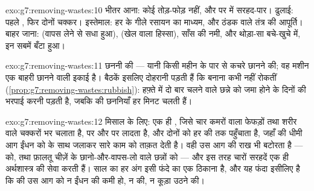 \begin{solution}{exo:g7:removing-wastes:10}
भीतर आना: कोई तोड़-फोड़ नहीं, और  पर  में सरहद-पार। ढुलाई:
पहले , फिर दोनों चक्कर। इस्तेमाल: हर  के गीले रसायन का
माध्यम, और ठंडक वाले तंत्र की आपूर्ति। बाहर जाना:  (वापस लेने से
सधा हुआ),  (खेल वाला हिस्सा), साँस की नमी, और थोड़ा-सा बचे-खुचे
में, इन सबमें बँटा हुआ।
\end{solution}

\begin{solution}{exo:g7:removing-wastes:11}
छननी की --- यानी किसी महीन  के पार  से कचरे छानने की; वह मशीन
एक बाहरी छानने वाली इकाई है। बैठकें इसलिए दोहरानी पड़ती हैं कि 
 बनाना कभी नहीं रोकतीं
(\cref{prop:g7:removing-wastes:rubbish}): हफ़्ते में दो बार चलने वाले
छन्ने को जमा होने के दिनों की भरपाई करनी पड़ती है, जबकि  की
छननियाँ हर मिनट चलती हैं।
\end{solution}

\begin{solution}{exo:g7:removing-wastes:12}
मिसाल के लिए: एक ही , जिसे चार कमरों वाला  फेफड़ों तथा शरीर वाले
चक्करों भर चलाता है,  पर  और  पर 
लादता है, और दोनों को हर  की  तक पहुँचाता है, जहाँ 
की धीमी आग ईंधन को  के साथ जलाकर सारे काम को ताक़त देती है। वही
 उस आग की राख भी बटोरता है ---   को,
 तथा फ़ालतू चीज़ें  के छानो-और-वापस-लो वाले छन्नों को ---
और इस तरह चारों सरहदें एक ही अर्थशास्त्र की सेवा करती हैं। साल का हर
अंग इसी फंदे का एक ठिकाना है, और यह फंदा इसीलिए है कि  की उस आग
को न ईंधन की कमी हो, न  की, न कूड़ा उठने की।
\end{solution}

